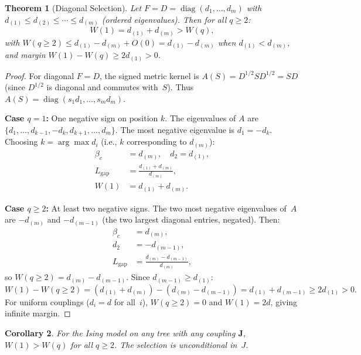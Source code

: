 \documentclass[11pt]{article}
\newtheorem{theorem}{Theorem}[section]
\newtheorem{corollary}[theorem]{Corollary}
\theoremstyle{definition}
\theoremstyle{remark}
\begin{document}
\begin{theorem}[Diagonal Selection]
\label{thm:diagonal}
Let $F = D = \operatorname{diag}(d_1, \ldots, d_m)$ with
$d_{(1)} \leq d_{(2)} \leq \cdots \leq d_{(m)}$ (ordered eigenvalues).
Then for all $q \geq 2$:
\begin{equation}
  W(1) = d_{(1)} + d_{(m)} > W(q),
  \label{eq:diagonal-W1}
\end{equation}
with $W(q \geq 2) \leq d_{(1)} - d_{(m)} + O(0) = d_{(1)} - d_{(m)}$
when $d_{(1)} < d_{(m)}$, and margin $W(1) - W(q) \geq 2 d_{(1)} > 0$.
\end{theorem}

\begin{proof}
For diagonal $F = D$, the signed metric kernel is
$A(S) = D^{1/2} S D^{1/2} = SD$ (since $D^{1/2}$ is diagonal and commutes
with~$S$). Thus $A(S) = \operatorname{diag}(s_1 d_1, \ldots, s_m d_m)$.

\medskip\noindent
\textbf{Case $q = 1$:} One negative sign on position $k$. The eigenvalues
of $A$ are $\{d_1, \ldots, d_{k-1}, -d_k, d_{k+1}, \ldots, d_m\}$.
The most negative eigenvalue is $d_1 = -d_k$. Choosing $k = \arg\max d_i$
(i.e., $k$ corresponding to $d_{(m)}$):
\begin{align}
  \beta_c &= d_{(m)}, \quad
  d_2 = d_{(1)}, \\
  L_{\mathrm{gap}} &= \frac{d_{(1)} + d_{(m)}}{d_{(m)}}, \\
  W(1) &= d_{(1)} + d_{(m)}.
\end{align}

\medskip\noindent
\textbf{Case $q \geq 2$:} At least two negative signs. The two most
negative eigenvalues of~$A$ are $-d_{(m)}$ and $-d_{(m-1)}$ (the two
largest diagonal entries, negated). Then:
\begin{align}
  \beta_c &= d_{(m)}, \\
  d_2 &= -d_{(m-1)}, \\
  L_{\mathrm{gap}} &= \frac{d_{(m)} - d_{(m-1)}}{d_{(m)}},
\end{align}
so $W(q \geq 2) = d_{(m)} - d_{(m-1)}$. Since $d_{(m-1)} \geq d_{(1)}$:
\[
  W(1) - W(q \geq 2) = (d_{(1)} + d_{(m)}) - (d_{(m)} - d_{(m-1)})
  = d_{(1)} + d_{(m-1)} \geq 2 d_{(1)} > 0.
\]
For uniform couplings ($d_i = d$ for all~$i$),
$W(q \geq 2) = 0$ and $W(1) = 2d$, giving infinite margin.
\end{proof}

\begin{corollary}
\label{cor:trees-select}
For the Ising model on any tree with any coupling $\mathbf{J}$,
$W(1) > W(q)$ for all $q \geq 2$. The selection is unconditional in~$J$.
\end{corollary}
\end{document}
